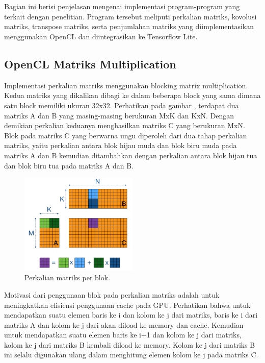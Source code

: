 \chapter{\babEmpat}
Bagian ini berisi penjelasan mengenai implementasi program-program yang terkait dengan penelitian. Program tersebut meliputi perkalian matriks, kovolusi matriks, transpose matriks, serta penjumlahan matriks yang diimplementasikan menggunakan OpenCL dan diintegrasikan ke Tensorflow Lite. 

\section{OpenCL Matriks Multiplication}
Implementasi perkalian matriks menggunakan blocking matrix multiplication. Kedua matriks yang dikalikan dibagi ke dalam beberapa block yang sama dimana satu block memiliki ukuran 32x32. Perhatikan pada gambar , terdapat dua matriks A dan B yang masing-masing berukuran MxK dan KxN. Dengan demikian perkalian keduanya menghasilkan matriks C yang berukuran MxN. Blok pada matriks C yang berwarna ungu diperoleh dari dua tahap perkalian matriks, yaitu perkalian antara blok hijau muda dan blok biru muda pada matriks A dan B kemudian ditambahkan dengan perkalian antara blok hijau tua dan blok biru tua pada matriks A dan B.

\begin{figure}
	\centering
	\includegraphics[width=0.50\textwidth]
	{pics/matmul-block1.png}
	\caption{Perkalian matriks per blok.}
	\label{fig:matmulblock}
\end{figure}

Motivasi dari penggunaan blok pada perkalian matriks adalah untuk meningkatkan efisiensi penggunaan cache pada GPU. Perhatikan bahwa untuk mendapatkan suatu elemen baris ke i dan kolom ke j dari matriks, baris ke i dari matriks A dan kolom ke j dari akan diload ke memory dan cache. Kemudian untuk mendapatkan suatu elemen baris ke i+1 dan kolom ke j dari matriks, kolom ke j dari matriks B kembali diload ke memory. Kolom ke j dari matriks B ini selalu digunakan ulang dalam menghitung elemen kolom ke j pada matriks C.

